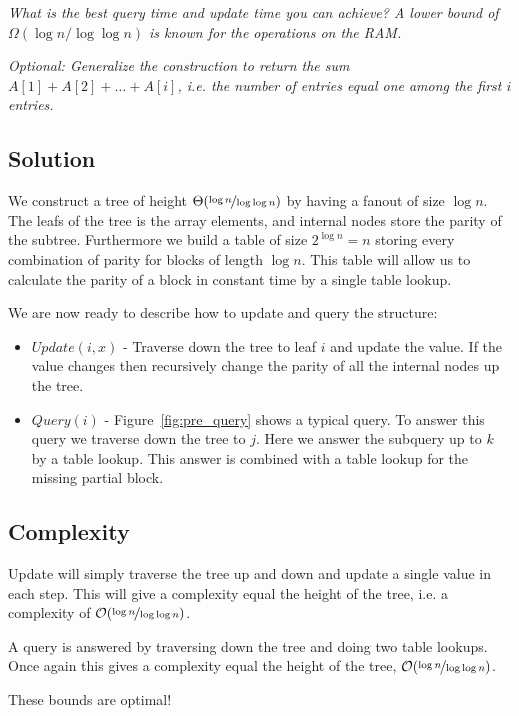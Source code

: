 \documentclass[a4paper,oneside,article,11pt]{memoir}
\begin{document}
\textit{What is the best query time and update time you can achieve? A lower bound of $\Omega(\log n/\log\log n)$ is known for the operations on the RAM.}

\textit{Optional: Generalize the construction to return the sum $A[1]+A[2]+\dots+A[i]$, i.e. the number of entries equal one among the first $i$ entries.}

\subsection{Solution}
We construct a tree of height $\Theta(\nicefrac{\log n}{\log\log n})$ by having a fanout of size $\log n$. The leafs of the tree is the array elements, and internal nodes store the parity of the subtree. Furthermore we build a table of size $2^{\log n} = n$ storing every combination of parity for blocks of length $\log n$. This table will allow us to calculate the parity of a block in constant time by a single table lookup.

We are now ready to describe how to update and query the structure:
\begin{itemize}
	\item{$Update(i, x)$ - Traverse down the tree to leaf $i$ and update the value. If the value changes then recursively change the parity of all the internal nodes up the tree.}
	\item{$Query(i)$ - Figure~\ref{fig:pre_query} shows a typical query. To answer this query we traverse down the tree to $j$. Here we answer the subquery up to $k$ by a table lookup. This answer is combined with a table lookup for the missing partial block.}
\end{itemize}

\subsection{Complexity}
Update will simply traverse the tree up and down and update a single value in each step. This will give a complexity equal the height of the tree, i.e. a complexity of $\mathcal{O}(\nicefrac{\log n}{\log\log n})$.

A query is answered by traversing down the tree and doing two table lookups. Once again this gives a complexity equal the height of the tree, $\mathcal{O}(\nicefrac{\log n}{\log\log n})$.

These bounds are optimal!


\end{document}
